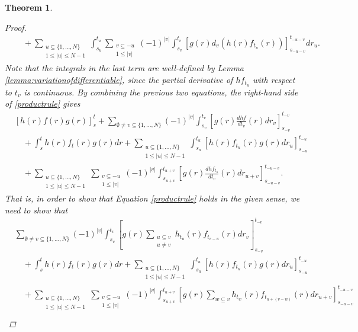 \documentclass[english, a4paper, 12pt,reqno]{amsart}
\newtheorem{theorem}[defi]{Theorem}
\begin{document}
\begin{theorem}
\begin{proof}
\begin{equation*}
\begin{split}
&\quad+ \sum_{\substack{u\subseteq\{1,\dots,N\}\\
1 \leq |u|\leq N-1}}\int_{s_u}^{t_u} \sum_{\substack{v\subseteq -u\\ 1\leq |v|}} (-1)^{|v|} \int_{s_v}^{t_v} [g(r) d_v(h(r)f_{t_u}(r))]_{s_{-u-v}}^{t_{-u-v}} dr_u.
\end{split}
\end{equation*}
Note that the integrals in the last term are well-defined by Lemma \ref{lemma:variationofdifferentiable}, since the partial derivative of $hf_{t_u}$ with respect to $t_v$ is continuous. By combining the previous two equations, the right-hand side of \eqref{productrule} gives
\begin{equation*}
\begin{split}
&[h(r)f(r)g(r)]_s^t +\sum_{\emptyset\neq v \subseteq \{1,\dots,N\}}(-1)^{|v|} \int_{s_v}^{t_v} [g(r)\frac{dhf}{dt_v}(r) dr_v]_{s_{-v}}^{t_{-v}}\\
&\quad+\int_{s}^{t} h(r)f_t(r)g(r) dr + \sum_{\substack{u\subseteq\{1,\dots,N\}\\
1 \leq |u|\leq N-1}} \int_{s_u}^{t_u} [h(r)f_{t_u}(r)g(r)dr_u]_{s_{-u}}^{t_{-u}}\\
&\quad+ \sum_{\substack{u\subseteq\{1,\dots,N\}\\
1 \leq |u|\leq N-1}} \sum_{\substack{v\subseteq -u\\ 1\leq |v|}} (-1)^{|v|} \int_{s_{u+v}}^{t_{u+v}} \left[g(r) \frac{dhf_{t_u}}{dt_v}(r) dr_{u+v}\right]_{s_{-u-v}}^{t_{-u-v}}.
\end{split}
\end{equation*}
That is, in order to show that Equation \eqref{productrule} holds in the given sense, we need to show that
\begin{equation*}
\begin{split}
&\sum_{\emptyset\neq v \subseteq \{1,\dots,N\}}(-1)^{|v|} \int_{s_v}^{t_v} [g(r)\sum_{\substack{u\subseteq v\\ u \neq v}}h_{t_u}(r)f_{t_{v-u}}(r) dr_v]_{s_{-v}}^{t_{-v}}\\
&\quad +\int_{s}^{t} h(r)f_t(r)g(r) dr + \sum_{\substack{u\subseteq\{1,\dots,N\}\\
1 \leq |u|\leq N-1}} \int_{s_u}^{t_u} [h(r)f_{t_u}(r)g(r)dr_u]_{s_{-u}}^{t_{-u}}\\
&\quad+ \sum_{\substack{u\subseteq\{1,\dots,N\}\\
1 \leq |u|\leq N-1}} \sum_{\substack{v\subseteq -u\\ 1\leq |v|}} (-1)^{|v|} \int_{s_{u+v}}^{t_{u+v}} \left[g(r) \sum_{w\subseteq v} h_{t_w}(r) f_{t_{u+(v-w)}}(r) dr_{u+v}\right]_{s_{-u-v}}^{t_{-u-v}}\\

\end{split}
\end{equation*}
\end{proof}
\end{theorem}
\end{document}
